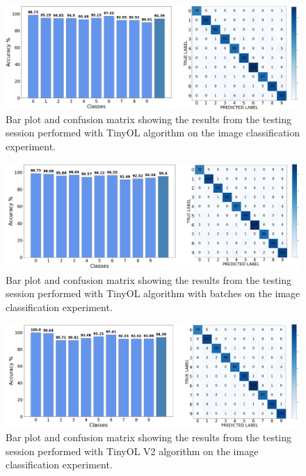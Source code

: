 \documentclass[12pt]{report}
\begin{document}
\begin{figure}[h!]
    \centering
    \includegraphics[width=140mm]{Figures/Chapter5/OPENMV_OL.png} 

    \caption{Bar plot and confusion matrix showing the results from the testing session performed with TinyOL algorithm on the image classification experiment.}
    \label{fig:openmv_res_OL}    
\end{figure}

\begin{figure}[h!]
    \centering
    \includegraphics[width=140mm]{Figures/Chapter5/OPENMV_OL_BATCH.png} 
    \caption{Bar plot and confusion matrix showing the results from the testing session performed with TinyOL algorithm with batches on the image classification experiment.}
    \label{fig:openmv_res_OL_batch}    
\end{figure}

\begin{figure}[h!]
    \centering
    \includegraphics[width=140mm]{Figures/Chapter5/OPENMV_OLV2.png} 
    \caption{Bar plot and confusion matrix showing the results from the testing session performed with TinyOL V2 algorithm on the image classification experiment.}
    \label{fig:openmv_res_OL_v2}    
\end{figure}
\end{document}
